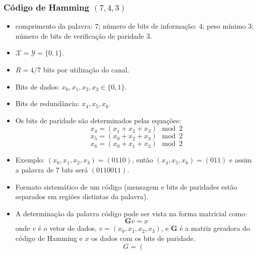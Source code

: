 \begin{frame}[allowframebreaks]
  \frametitle{Código de Hamming $(7,4,3)$}
  \begin{itemize}
  \item comprimento da palavra: $7$; número de bits de informação: $4$; peso mínimo $3$; número de bits de verificação de paridade $3$.
  \item $\mathcal{X} = \mathcal{Y} = \{0,1\}$.
  \item $R = 4/7$ bits por utilização do canal.
  \item Bits de dados: $x_0, x_1, x_2, x_3 \in \{0,1\}$.
  \item Bits de redundância: $x_4, x_5, x_6$.
  \item Os bits de paridade são determinados pelas equações:
	\begin{equation}
	x_4 = (x_1 + x_2 + x_3) \mod 2
	\end{equation}
        \begin{equation}
        x_5 = (x_0 + x_2 + x_3) \mod 2
        \end{equation}
        \begin{equation}
        x_6 = (x_0 + x_1 + x_3) \mod 2
        \end{equation}
  \item Exemplo: $(x_0, x_1, x_2, x_3) = (0110)$, então $(x_4,x_5,x_6) = (011)$ e assim a palavra de 7 bits
	será $(0110011)$.
  \item Formato sistemático de um código (mensagem e bits de paridades estão separados em regiões distintas da palavra).
  \item A determinação da palavra código pode ser vista na forma matricial como:
	\begin{equation}
	\mathbf{G} v = x
	\end{equation}
	onde $v$ é o vetor de dados, $v = (x_0, x_1, x_2, x_3)$, e 
	$\mathbf{G}$ é a matriz geradora do código de Hamming e $x$
	os dados com os bits de paridade.
	\begin{equation}
	G = 
	\left(
  \begin{array}{cccc}

\end{array}
\end{equation}
\end{itemize}
\end{frame}
